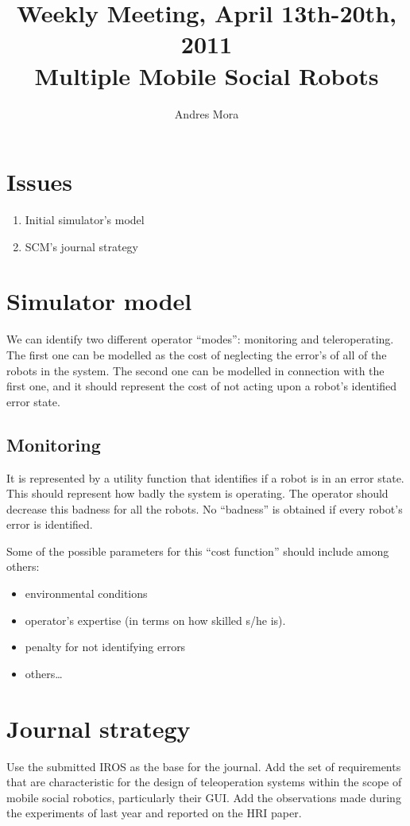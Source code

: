 \documentclass[a4paper, 10pt]{article}
\begin{document}
\title{Weekly Meeting, April 13th-20th, 2011
\\Multiple Mobile Social Robots}
\author{Andres Mora}
\date{} %

\maketitle

\section{Issues}
\begin{enumerate}
  \item Initial simulator's model
  \item SCM's journal strategy
\end{enumerate}

\section{Simulator model}
We can identify two different operator ``modes'': monitoring and teleroperating.
The first one can be modelled as the cost of neglecting the error's of all of the robots in the system.
The second one can be modelled in connection with the first one, and it should represent the cost of not acting upon a robot's identified error state.

\subsection{Monitoring}
It is represented by a utility function that identifies if a robot is in an error state.
This should represent how badly the system is operating.
The operator should decrease this badness for all the robots. 
No ``badness'' is obtained if every robot's error is identified.

Some of the possible parameters for this ``cost function'' should include among others:
\begin{itemize}
  \item environmental conditions
  \item operator's expertise (in terms on how skilled s/he is).
  \item penalty for not identifying errors
  \item others\ldots
\end{itemize}


\section{Journal strategy}
Use the submitted IROS as the base for the journal. 
Add the set of requirements that are characteristic for the design of teleoperation systems within the scope of mobile social robotics, particularly their GUI.
Add the observations made during the experiments of last year and reported on the HRI paper.
\end{document}
